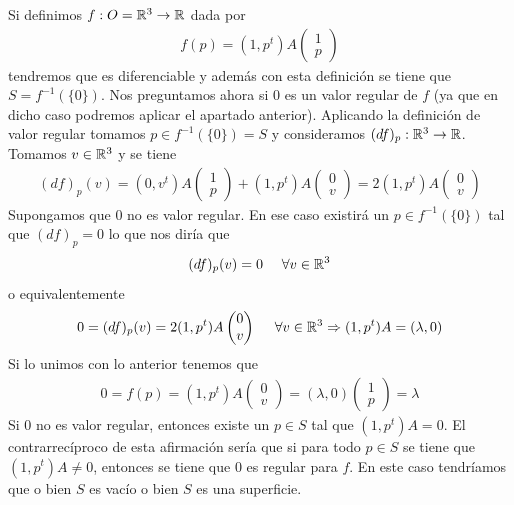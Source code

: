 \begin{ejemplo}
\begin{enumerate}
        Si definimos $f:O=\mathbb{R}^3 \to \mathbb{R}$ dada por 
        \begin{gather*}
            f(p) =  (1,p^t)A \begin{pmatrix} 1\\p\end{pmatrix}
        \end{gather*}
        tendremos que es diferenciable y además con esta definición se tiene que $S=f^{-1}(\{0\})$. Nos preguntamos ahora si $0$ es un valor regular de $f$ (ya que en dicho caso podremos aplicar el apartado anterior). Aplicando la definición de valor regular tomamos $p\in f^{-1}(\{0\})=S$ y consideramos $(df)_p:\mathbb{R}^3 \to \mathbb{R}$. Tomamos $v\in \mathbb{R}^3$ y se tiene 
        \begin{gather*}
            (df)_p(v) = (0,v^t)A\begin{pmatrix} 1\\p\end{pmatrix} + (1,p^t)A\begin{pmatrix} 0\\v\end{pmatrix} = 2(1,p^t)A\begin{pmatrix} 0\\v\end{pmatrix}
        \end{gather*}
        Supongamos que $0$ no es valor regular. En ese caso existirá un $p\in f^{-1}(\{0\})$ tal que $(df)_p = 0$ lo que nos diría que 
        \begin{gather*}
            (df)_p(v) = 0 \ \ \ \ \forall v \in \mathbb{R}^3
        \end{gather*}
        o equivalentemente
        \begin{gather*}
            0 = (df)_p(v) = 2(1,p^t)A \begin{pmatrix} 0\\v\end{pmatrix} \ \ \ \ \forall v \in \mathbb{R}^3 \Rightarrow (1,p^t)A = (\lambda, 0)
        \end{gather*}
        Si lo unimos con lo anterior tenemos que 
        \begin{gather*}
            0 = f(p) = (1,p^t)A \begin{pmatrix} 0\\v\end{pmatrix} = (\lambda, 0)\begin{pmatrix} 1\\p\end{pmatrix} = \lambda
        \end{gather*}
        Si $0$ no es valor regular, entonces existe un $p\in S$ tal que $(1,p^t)A = 0$. El contrarrecíproco de esta afirmación sería que si para todo $p\in S$ se tiene que $(1,p^t)A\neq 0$, entonces se tiene que $0$ es regular para $f$. En este caso tendríamos que o bien $S$ es vacío o bien $S$ es una superficie.\\
        

\end{enumerate}
\end{ejemplo}
